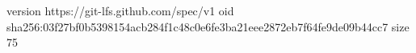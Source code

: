 version https://git-lfs.github.com/spec/v1
oid sha256:03f27bf0b5398154acb284f1c48c0e6fe3ba21eee2872eb7f64fe9de09b44cc7
size 75
